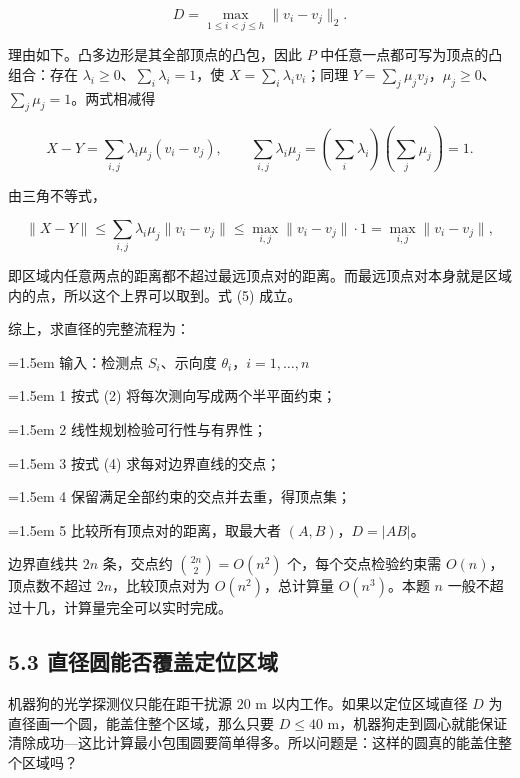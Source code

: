 \documentclass[UTF8,a4paper,zihao=-4,fontset=fandol]{ctexart}
\begin{document}
\[
D=\max_{1\le i<j\le h}\|v_i-v_j\|_2 . \tag{5}
\]

理由如下。凸多边形是其全部顶点的凸包，因此 $P$ 中任意一点都可写为顶点的凸组合：存在 $\lambda_i\ge0$、$\sum_i\lambda_i=1$，使 $X=\sum_i\lambda_iv_i$；同理 $Y=\sum_j\mu_jv_j$，$\mu_j\ge0$、$\sum_j\mu_j=1$。两式相减得

\[
X-Y=\sum_{i,j}\lambda_i\mu_j(v_i-v_j),
\qquad
\sum_{i,j}\lambda_i\mu_j=\left(\sum_i\lambda_i\right)\left(\sum_j\mu_j\right)=1 .
\]

由三角不等式，

\[
\|X-Y\|\le\sum_{i,j}\lambda_i\mu_j\|v_i-v_j\|\le\max_{i,j}\|v_i-v_j\|\cdot1=\max_{i,j}\|v_i-v_j\|,
\]

即区域内任意两点的距离都不超过最远顶点对的距离。而最远顶点对本身就是区域内的点，所以这个上界可以取到。式 (5) 成立。

综上，求直径的完整流程为：

\begin{tcolorbox}[colback=black!2,colframe=black!22,boxrule=0.4pt,arc=0pt,left=9pt,right=9pt,top=7pt,bottom=7pt]
\small\setlength{\parskip}{2pt}
\noindent\hangindent=1.5em 输入：检测点 $S_i$、示向度 $\theta_i$，$i=1,\dots,n$\par
\noindent\hangindent=1.5em 1  按式 (2) 将每次测向写成两个半平面约束；\par
\noindent\hangindent=1.5em 2  线性规划检验可行性与有界性；\par
\noindent\hangindent=1.5em 3  按式 (4) 求每对边界直线的交点；\par
\noindent\hangindent=1.5em 4  保留满足全部约束的交点并去重，得顶点集；\par
\noindent\hangindent=1.5em 5  比较所有顶点对的距离，取最大者 $(A,B)$，$D=|AB|$。\par
\end{tcolorbox}

边界直线共 $2n$ 条，交点约 $\binom{2n}{2}=O(n^2)$ 个，每个交点检验约束需 $O(n)$，顶点数不超过 $2n$，比较顶点对为 $O(n^2)$，总计算量 $O(n^3)$。本题 $n$ 一般不超过十几，计算量完全可以实时完成。

\subsection*{5.3 直径圆能否覆盖定位区域}

机器狗的光学探测仪只能在距干扰源 $20$ m 以内工作。如果以定位区域直径 $D$ 为直径画一个圆，能盖住整个区域，那么只要 $D\le40$ m，机器狗走到圆心就能保证清除成功---这比计算最小包围圆要简单得多。所以问题是：这样的圆真的能盖住整个区域吗？
\end{document}
